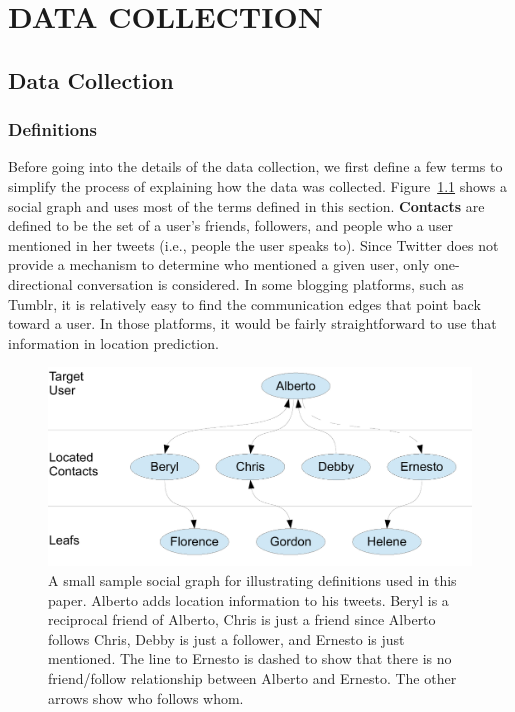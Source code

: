\ifdefined\THESIS
    \chapter{\uppercase {Data Collection}}

\else
    \section{Data Collection}
\fi

\subsection{Definitions}

Before going into the details of the data collection, we first define a few
terms to simplify the process of explaining how the data was collected.
%
Figure~\ref{fig:Terms} shows a social graph and uses most of the terms defined
in this section.
%
\textbf{Contacts} are defined to be the set of a user's friends, followers, and
people who a user mentioned in her tweets (i.e., people the user speaks to).
%
Since Twitter does not provide a mechanism to determine who mentioned a given
user, only one-directional conversation is considered.
%
In some blogging platforms, such as Tumblr, it is relatively easy to find the
communication edges that point back toward a user.
%
In those platforms, it would be fairly straightforward to use that information
in location prediction.

\begin{figure}[tb]
\centering
\includegraphics[width=\linewidth]{figures/terms.pdf}
\caption{
A small sample social graph for illustrating definitions used in this paper.
Alberto adds location information to his tweets.
Beryl is a reciprocal friend of Alberto, Chris is just a friend since Alberto
follows Chris, Debby is just a follower, and Ernesto is just mentioned.
The line to Ernesto is dashed to show that there is no friend/follow
relationship between Alberto and Ernesto.
The other arrows show who follows whom.
}
\label{fig:Terms}
\end{figure}

